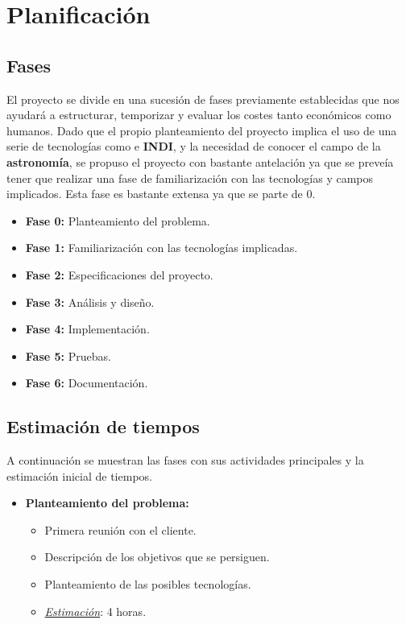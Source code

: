 \chapter{Planificación}

\section{Fases}

El proyecto se divide en una sucesión de fases previamente establecidas que nos ayudará a estructurar, temporizar y evaluar los costes tanto económicos como humanos. Dado que el propio planteamiento del proyecto implica el uso de una serie de tecnologías como  e \textbf{INDI}, y la necesidad de conocer el campo de la \textbf{astronomía}, se propuso el proyecto con bastante antelación ya que se preveía tener que realizar una fase de familiarización con las tecnologías y campos implicados. Esta fase es bastante extensa ya que se parte de 0.

\begin{itemize}
  \item \textbf{Fase 0:} Planteamiento del problema.
  \item \textbf{Fase 1:} Familiarización con las tecnologías implicadas.
  \item \textbf{Fase 2:} Especificaciones del proyecto.
  \item \textbf{Fase 3:} Análisis y diseño.
  \item \textbf{Fase 4:} Implementación.
  \item \textbf{Fase 5:} Pruebas.
  \item \textbf{Fase 6:} Documentación.
\end{itemize}

\newpage
\section{Estimación de tiempos}

A continuación se muestran las fases con sus actividades principales y la estimación inicial de tiempos.

\begin{itemize}
   \item \textbf{Planteamiento del problema:}
   \begin{itemize}
    \item Primera reunión con el cliente.
    \item Descripción de los objetivos que se persiguen.
    \item Planteamiento de las posibles tecnologías.
    \item \underline{\textit{Estimación}}: 4 horas.
    \end{itemize}
\end{itemize}

